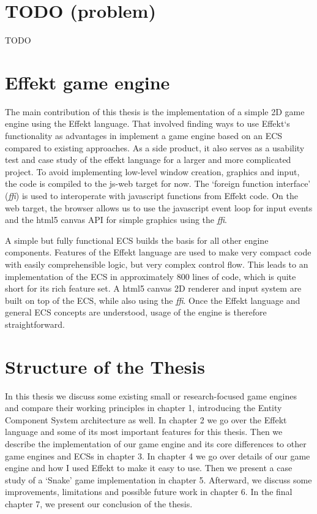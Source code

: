 \section*{TODO (problem)}

TODO

\section*{Effekt game engine}

The main contribution of this thesis is the implementation of a simple 2D game engine using the Effekt language. That involved finding ways to use Effekt`s functionality as advantages in implement a game engine based on an ECS compared to existing approaches. As a side product, it also serves as a usability test and case study of the effekt language for a larger and more complicated project. To avoid implementing low-level window creation, graphics and input, the code is compiled to the \textsf{js-web} target for now. The `foreign function interface' (\textit{ffi}) is used to interoperate with javascript functions from Effekt code. On the web target, the browser allows us to use the javascript event loop for input events and the html5 \textsf{canvas} API for simple graphics using the \textit{ffi}.

A simple but fully functional ECS builds the basis for all other engine components. Features of the Effekt language are used to make very compact code with easily comprehensible logic, but very complex control flow. This leads to an implementation of the ECS in approximately 800 lines of code, which is quite short for its rich feature set. A html5 \textsf{canvas} 2D renderer and input system are built on top of the ECS, while also using the \textit{ffi}. Once the Effekt language and general ECS concepts are understood, usage of the engine is therefore straightforward.

\section*{Structure of the Thesis}

In this thesis we discuss some existing small or research-focused game engines and compare their working principles in chapter 1, introducing the Entity Component System architecture as well. In chapter 2 we go over the Effekt language and some of its most important features for this thesis. Then we describe the implementation of our game engine and its core differences to other game engines and ECSs in chapter 3. In chapter 4 we go over details of our game engine and how I used Effekt to make it easy to use. Then we present a case study of a `Snake' game implementation in chapter 5. Afterward, we discuss some improvements, limitations and possible future work in chapter 6. In the final chapter 7, we present our conclusion of the thesis.
